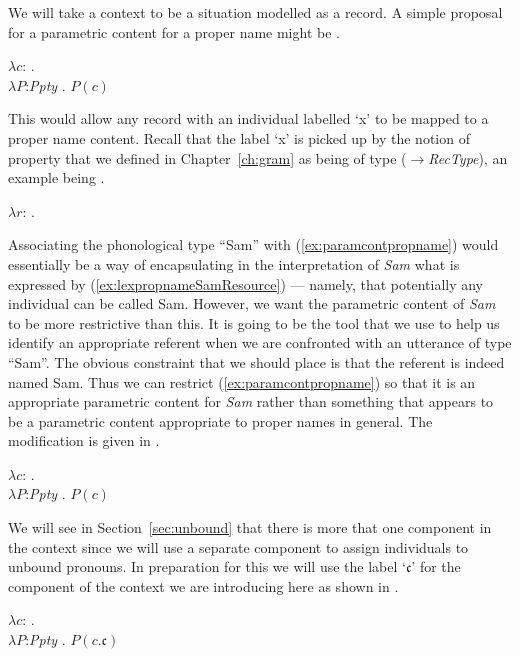 We will take a context to be a situation
modelled as a record.  A simple proposal for a parametric content for
a proper name might be \nexteg{}.
\begin{ex} 
$\lambda c$: . \\
\hspace*{1em}$\lambda P$:\textit{Ppty} . $P(c)$
\label{ex:paramcontpropname} 
\end{ex} 
This would allow any record with an individual labelled `x' to be
mapped to a proper name content.  Recall that the label `x' is picked
up by the notion of property that we defined in Chapter~\ref{ch:gram}
as being of type
($\rightarrow$\textit{RecType}),
an example being \nexteg{}. 
\begin{ex} 
$\lambda r$: .  
\end{ex} 
Associating the phonological type ``Sam'' with
(\ref{ex:paramcontpropname}) would essentially be a way of
encapsulating in the interpretation of \textit{Sam} what is expressed
by (\ref{ex:lexpropnameSamResource}) --- namely, that potentially any
individual can be called Sam.  However, we want the parametric content of
\textit{Sam} to be
more restrictive than this.  It is going to be the tool that we use to
help us identify an appropriate referent when we are confronted with
an utterance of type ``Sam''.  The obvious constraint that we should
place is that the referent is indeed named Sam.  Thus we can restrict
(\ref{ex:paramcontpropname}) so that it is an appropriate parametric
content for \textit{Sam} rather than something that appears to be a
parametric content appropriate to proper names in general.  The
modification is given in \nexteg{}.
\begin{ex} 
$\lambda c$: . \\
\hspace*{5em}$\lambda P$:\textit{Ppty} . $P(c)$ 
\end{ex}

We will see in Section~\ref{sec:unbound} that there is more that one
component in the context since we will use a separate component to
assign individuals to unbound pronouns.  In preparation for this we
will use the label `$\mathfrak{c}$' for the component of the context
we are introducing here as shown in \nexteg{}.
\begin{ex} 
  $\lambda c$: . \\
\hspace*{5em}$\lambda P$:\textit{Ppty} . $P(c.\mathfrak{c})$ 
\label{ex:parametricSam}
\end{ex}

